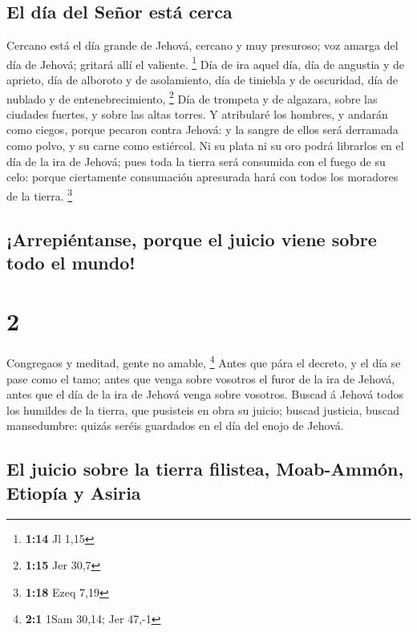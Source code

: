 \hypertarget{el-duxeda-del-seuxf1or-estuxe1-cerca}{%
\subsection{El día del Señor está
cerca}\label{el-duxeda-del-seuxf1or-estuxe1-cerca}}

 Cercano está el día grande de Jehová, cercano y muy
presuroso; voz amarga del día de Jehová; gritará allí el valiente.
\footnote{\textbf{1:14} Jl 1,15}  Día de ira aquel día, día
de angustia y de aprieto, día de alboroto y de asolamiento, día de
tiniebla y de oscuridad, día de nublado y de entenebrecimiento,
\footnote{\textbf{1:15} Jer 30,7}  Día de trompeta y de
algazara, sobre las ciudades fuertes, y sobre las altas torres.
 Y atribularé los hombres, y andarán como ciegos, porque
pecaron contra Jehová: y la sangre de ellos será derramada como polvo, y
su carne como estiércol.  Ni su plata ni su oro podrá
librarlos en el día de la ira de Jehová; pues toda la tierra será
consumida con el fuego de su celo: porque ciertamente consumación
apresurada hará con todos los moradores de la tierra. \footnote{\textbf{1:18}
  Ezeq 7,19}

\hypertarget{arrepiuxe9ntanse-porque-el-juicio-viene-sobre-todo-el-mundo}{%
\subsection{¡Arrepiéntanse, porque el juicio viene sobre todo el
mundo!}\label{arrepiuxe9ntanse-porque-el-juicio-viene-sobre-todo-el-mundo}}

\hypertarget{section-1}{%
\section{2}\label{section-1}}

 Congregaos y meditad, gente no amable, \footnote{\textbf{2:1}
  1Sam 30,14; Jer 47,-1}  Antes que pára el decreto, y el
día se pase como el tamo; antes que venga sobre vosotros el furor de la
ira de Jehová, antes que el día de la ira de Jehová venga sobre
vosotros.  Buscad á Jehová todos los humildes de la tierra,
que pusisteis en obra su juicio; buscad justicia, buscad mansedumbre:
quizás seréis guardados en el día del enojo de Jehová.

\hypertarget{el-juicio-sobre-la-tierra-filistea-moab-ammuxf3n-etiopuxeda-y-asiria}{%
\subsection{El juicio sobre la tierra filistea, Moab-Ammón, Etiopía y
Asiria}\label{el-juicio-sobre-la-tierra-filistea-moab-ammuxf3n-etiopuxeda-y-asiria}}

